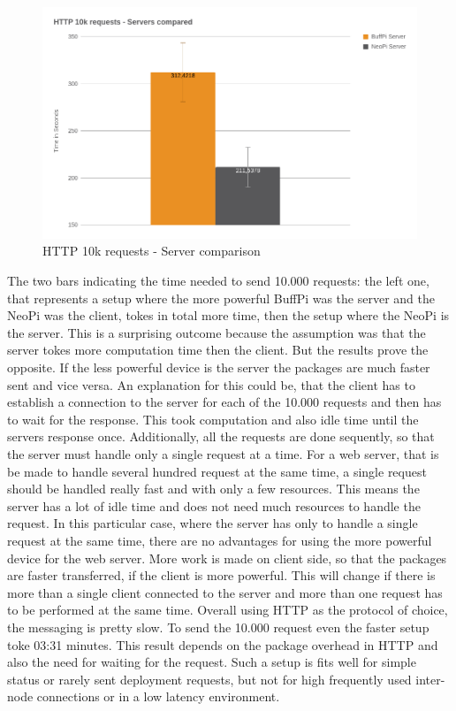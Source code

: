 \begin{figure}[H]
    \centering
    \includegraphics[width=\textwidth]{resources/images/performance_http_server_comparison.png}
    \caption[HTTP 10k requests - Server comparison]{HTTP 10k requests - Server comparison}
    \label{fig:performance_http_server_comparison}
\end{figure}

The two bars indicating the time needed to send 10.000 requests: the left one, that represents a setup where the more powerful BuffPi was the server and the NeoPi was the client, tokes in total more time, then the setup where the NeoPi is the server.
This is a surprising outcome because the assumption was that the server tokes more computation time then the client.
But the results prove the opposite.
If the less powerful device is the server the packages are much faster sent and vice versa.
An explanation for this could be, that the client has to establish a connection to the server for each of the 10.000 requests and then has to wait for the response.
This took computation and also idle time until the servers response once.
Additionally, all the requests are done sequently, so that the server must handle only a single request at a time.
For a web server, that is be made to handle several hundred request at the same time, a single request should be handled really fast and with only a few resources.
This means the server has a lot of idle time and does not need much resources to handle the request.
In this particular case, where the server has only to handle a single request at the same time, there are no advantages for using the more powerful device for the web server.
More work is made on client side, so that the packages are faster transferred, if the client is more powerful.
This will change if there is more than a single client connected to the server and more than one request has to be performed at the same time.
Overall using \ac{HTTP} as the protocol of choice, the messaging is pretty slow.
To send the 10.000 request even the faster setup toke 03:31 minutes.
This result depends on the package overhead in \ac{HTTP} and also the need for waiting for the request.
Such a setup is fits well for simple status or rarely sent deployment requests, but not for high frequently used inter-node connections or in a low latency environment.

